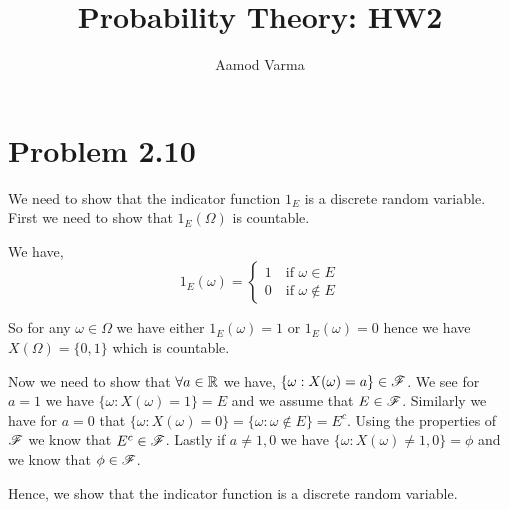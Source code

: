 \documentclass[a4paper]{report}
\title{Probability Theory: HW2}
\author{Aamod Varma}
\begin{document}
\maketitle
\date{}

\section*{Problem 2.10}
We need to show that the indicator function $1_E$ is a discrete random variable. First we need to show that $1_E(\Omega)$ is countable. 

\vspace{1em}

We have, 
$$ 1_E(\omega) = \begin{cases} 1 \quad \text{if } \omega \in E \\ 0 \quad \text{if } \omega \not \in E \end{cases} $$ 

So for any $\omega \in \Omega$ we have either  $1_E(\omega) = 1$ or $1_E(\omega) = 0$ hence we have  $X(\Omega) = \{0, 1\}$  which is countable. 

\vspace{1em}

Now we need to show that $\forall a \in \mathbb{R}$ we have, $\{ \omega: X(\omega) = a\}  \in \mathscr{F}$. We see for $a = 1$  we have $\{\omega : X(\omega) = 1\} = E$ and we assume that $E \in \mathscr{F}$. Similarly we have  for $a = 0$ that $\{\omega : X(\omega) = 0\} = \{\omega: \omega \not \in E\} = E^{c}$. Using the properties of $\mathscr{F}$ we know that  $E^{c} \in \mathscr{F}$. Lastly if $a \ne 1, 0$ we have $\{\omega: X(\omega) \ne 1,0\} = \phi $ and we know that $\phi \in \mathscr{F}$.

\vspace{1em}

Hence, we show that the indicator function is a discrete random variable.
\end{document}
